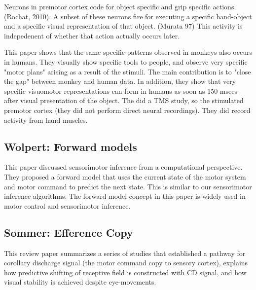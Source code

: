 \documentclass{article} %
\begin{document}
Neurons in premotor cortex code for object specific and grip specific actions.
(Rochat, 2010). A subset of these neurons fire for executing a specific
hand-object and a specific visual representation of that object. (Murata 97)
This activity is indepedenent of whether that action actually occurs later.

This paper shows that the same specific patterns observed in monkeys also occurs
in humans.  They visually show specific tools to people, and observe very
specific "motor plans" arising as a result of the stimuli. The main contribution
is to "close the gap" between monkey and human data. In addition, they show that
very specific visuomotor representations can form in humans as soon as 150 msecs
after visual presentation of the object.  The did a TMS study, so the stimulated
premotor cortex (they did not perform direct neural recordings).  They did
record activity from hand muscles.

\subsection{Wolpert: Forward models}

This paper \cite{Wolpert1996} discussed sensorimotor inference from a
computational perspective. They proposed a forward model that uses the current
state of the motor system and motor command to predict the next state. This is
similar to our sensorimotor inference algorithms. The forward model concept in
this paper is widely used in motor control and sensorimotor inference.

\subsection{Sommer: Efference Copy}

This review paper \cite{Sommer2006} summarizes a series of studies that
established a  pathway for corollary discharge signal (the motor command copy to
sensory cortex), explains how predictive shifting of receptive field is
constructed with CD signal, and how visual stability is achieved despite
eye-movements.



%

\end{document}
